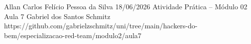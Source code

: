 \documentclass{article}
\begin{document}
{Allan Carlos Felício Pessoa da Silva}
{18/06/2026}
{Atividade Prática -- Módulo 02}
{Aula 7}
{Gabriel dos Santos Schmitz}
{https://github.com/gabrielzschmitz/uni/tree/main/hackers-do-bem/especializacao-red-team/modulo2/aula7}


\newpage



\newpage
\printbibliography[title=Referências]
\end{document}
